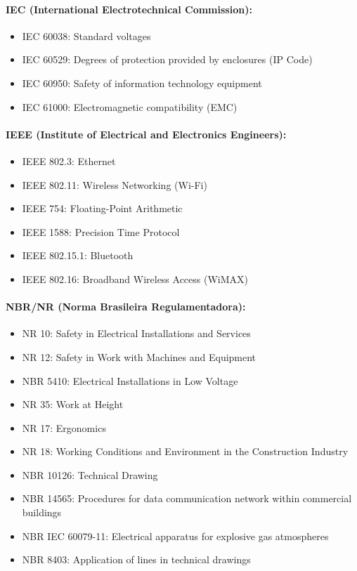 \paragraph{IEC (International Electrotechnical Commission):}
\begin{itemize}
    \item IEC 60038: Standard voltages
    \item IEC 60529: Degrees of protection provided by enclosures (IP Code)
    \item IEC 60950: Safety of information technology equipment
    \item IEC 61000: Electromagnetic compatibility (EMC)
\end{itemize}

\paragraph{IEEE (Institute of Electrical and Electronics Engineers):}
\begin{itemize}
    \item IEEE 802.3: Ethernet
    \item IEEE 802.11: Wireless Networking (Wi-Fi)
    \item IEEE 754: Floating-Point Arithmetic
    \item IEEE 1588: Precision Time Protocol
    \item IEEE 802.15.1: Bluetooth
    \item IEEE 802.16: Broadband Wireless Access (WiMAX)
\end{itemize}

\paragraph{NBR/NR (Norma Brasileira Regulamentadora):}
\begin{itemize}
    \item NR 10: Safety in Electrical Installations and Services
    \item NR 12: Safety in Work with Machines and Equipment
    \item NBR 5410: Electrical Installations in Low Voltage
    \item NR 35: Work at Height
    \item NR 17: Ergonomics
    \item NR 18: Working Conditions and Environment in the Construction Industry
    \item NBR 10126: Technical Drawing
    \item NBR 14565: Procedures for data communication network within commercial buildings
    \item NBR IEC 60079-11: Electrical apparatus for explosive gas atmospheres
    \item NBR 8403: Application of lines in technical drawings
\end{itemize}

